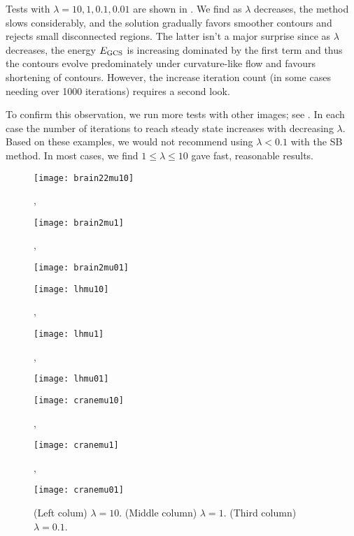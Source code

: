Tests with $\lambda = 10, 1, 0.1, 0.01$ are shown in . We find as $\lambda$ decreases, the method slows considerably, and the solution gradually favors smoother contours and rejects small disconnected regions. The latter isn't a major surprise since as $\lambda$ decreases, the energy $E_\textrm{GCS}$ is increasing dominated by the first term and thus the contours evolve predominately under curvature-like flow and favours shortening of contours. However, the increase iteration count (in some cases needing over 1000 iterations) requires a second look. 

To confirm this observation, we run more tests with other images; see . In each case the number of iterations to reach steady state increases with decreasing $\lambda$. Based on these examples, we would not recommend using $\lambda < 0.1$ with the SB method. In most cases, we find $1 \leq \lambda\leq 10$ gave fast, reasonable results.


\begin{figure}[htb!]
	\centering
	\begin{minipage}{0.32\textwidth}
		\texttt{[image: brain22mu10]}
	\end{minipage},
	\begin{minipage}{0.32\textwidth}
		\texttt{[image: brain2mu1]}
	\end{minipage},
	\begin{minipage}{0.32\textwidth}
		\texttt{[image: brain2mu01]}
	\end{minipage}
	
	\vspace{6mm}
	
	\begin{minipage}{0.32\textwidth}
		\texttt{[image: lhmu10]}
	\end{minipage},
	\begin{minipage}{0.32\textwidth}
		\texttt{[image: lhmu1]}
	\end{minipage},
	\begin{minipage}{0.32\textwidth}
		\texttt{[image: lhmu01]}
	\end{minipage}
	\vspace{6mm}
	
	\begin{minipage}{0.32\textwidth}
		\texttt{[image: cranemu10]}
	\end{minipage},
	\begin{minipage}{0.32\textwidth}
		\texttt{[image: cranemu1]}
	\end{minipage},
	\begin{minipage}{0.32\textwidth}
		\texttt{[image: cranemu01]}
	\end{minipage}
	\vspace{6mm}
	
	\caption{(Left colum) $\lambda = 10$. (Middle column) $\lambda = 1$. (Third column) $\lambda = 0.1$.}
	\label{fig:sb_sample}
\end{figure}





